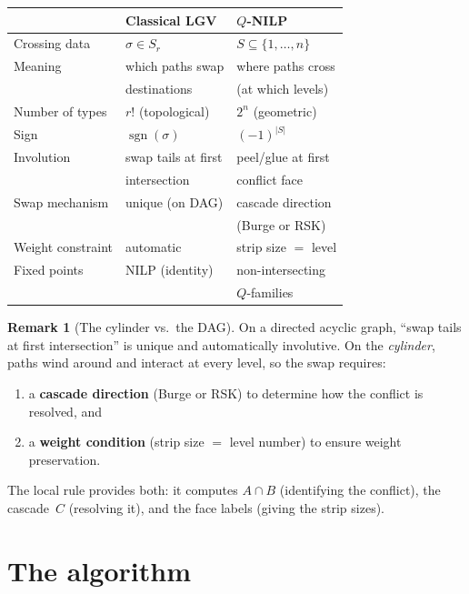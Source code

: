 \documentclass[11pt]{article}
\DeclareMathOperator{\sgn}{sgn}
\theoremstyle{plain}
\theoremstyle{definition}
\newtheorem{remark}[theorem]{Remark}
\begin{document}
\begin{center}
\begin{tabular}{l|l|l}
  & \textbf{Classical LGV} & \textbf{$Q$-NILP} \\ \hline
Crossing data &
  $\sigma \in S_r$ &
  $S \subseteq \{1, \ldots, n\}$ \\
Meaning &
  which paths swap &
  where paths cross \\
  & destinations & (at which levels) \\
Number of types &
  $r!$ (topological) &
  $2^n$ (geometric) \\
Sign &
  $\sgn(\sigma)$ &
  $(-1)^{|S|}$ \\
Involution &
  swap tails at first &
  peel/glue at first \\
  & intersection & conflict face \\
Swap mechanism &
  unique (on DAG) &
  cascade direction \\
  & & (Burge or RSK) \\
Weight constraint &
  automatic &
  strip size $= $ level \\
Fixed points &
  NILP (identity) &
  non-intersecting \\
  & & $Q$-families
\end{tabular}
\end{center}

\begin{remark}[The cylinder vs.\ the DAG]
\label{rem:cylinder}
On a directed acyclic graph, ``swap tails at first
intersection'' is unique and automatically involutive.
On the \emph{cylinder}, paths wind around and interact
at every level, so the swap requires:
\begin{enumerate}
  \item a \textbf{cascade direction} (Burge or RSK) to
    determine how the conflict is resolved, and
  \item a \textbf{weight condition} (strip size
    $=$ level number) to ensure weight preservation.
\end{enumerate}
The local rule provides both: it computes $A \cap B$
(identifying the conflict), the cascade~$C$ (resolving
it), and the face labels (giving the strip sizes).
\end{remark}


\section{The algorithm}
\label{sec:algorithm}
\end{document}
